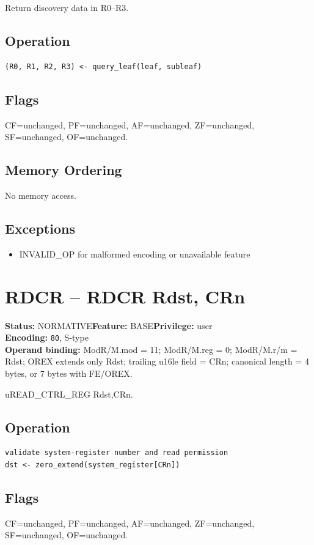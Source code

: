 \documentclass[10pt]{article}
\begin{document}
Return discovery data in R0--R3.

\subsection*{Operation}
\begin{lstlisting}
(R0, R1, R2, R3) <- query_leaf(leaf, subleaf)
\end{lstlisting}
\subsection*{Flags}
CF=unchanged, PF=unchanged, AF=unchanged, ZF=unchanged, SF=unchanged, OF=unchanged.
\subsection*{Memory Ordering}
No memory access.
\subsection*{Exceptions}
\begin{itemize}
\item INVALID\_OP for malformed encoding or unavailable feature
\end{itemize}
\clearpage

\section{RDCR -- RDCR Rdst, CRn}
\textbf{Status:} NORMATIVE\quad \textbf{Feature:} BASE\quad \textbf{Privilege:} user\\
\textbf{Encoding:} \texttt{80}, S-type\\
\textbf{Operand binding:} ModR/M.mod = 11; ModR/M.reg = 0; ModR/M.r/m = Rdst; OREX extends only Rdst; trailing u16le field = CRn; canonical length = 4 bytes, or 7 bytes with FE/OREX.

uREAD\_CTRL\_REG Rdst,CRn.

\subsection*{Operation}
\begin{lstlisting}
validate system-register number and read permission
dst <- zero_extend(system_register[CRn])
\end{lstlisting}
\subsection*{Flags}
CF=unchanged, PF=unchanged, AF=unchanged, ZF=unchanged, SF=unchanged, OF=unchanged.
\end{document}
